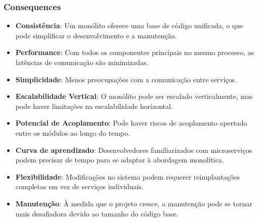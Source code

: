 \subsubsection*{Consequences}
\begin{itemize}
	\item \textbf{Consistência}: Um monólito oferece uma base de código unificada, o que pode simplificar o desenvolvimento e a manutenção.
	\item \textbf{Performance}: Com todos os componentes principais no mesmo processo, as latências de comunicação são minimizadas.
	\item \textbf{Simplicidade}: Menos preocupações com a comunicação entre serviços.
	\item \textbf{Escalabilidade Vertical}: O monólito pode ser escalado verticalmente, mas pode haver limitações na escalabilidade horizontal.
	\item \textbf{Potencial de Acoplamento}: Pode haver riscos de acoplamento apertado entre os módulos ao longo do tempo.
	\item \textbf{Curva de aprendizado}: Desenvolvedores familiarizados com microserviços podem precisar de tempo para se adaptar à abordagem monolítica.
	\item \textbf{Flexibilidade}: Modificações no sistema podem requerer reimplantações completas em vez de serviços individuais.
	\item \textbf{Manutenção}: À medida que o projeto cresce, a manutenção pode se tornar mais desafiadora devido ao tamanho do código base.
\end{itemize}
